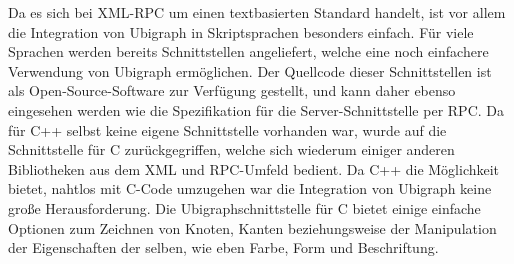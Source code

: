 Da es sich bei XML-RPC um einen textbasierten Standard handelt, ist vor allem die Integration von Ubigraph in Skriptsprachen besonders einfach. Für viele Sprachen werden bereits Schnittstellen angeliefert,
welche eine noch einfachere Verwendung von Ubigraph ermöglichen. Der Quellcode dieser Schnittstellen ist als Open-Source-Software zur Verfügung gestellt, und kann daher ebenso eingesehen werden wie die
Spezifikation für die Server-Schnittstelle per RPC\@. Da für C++ selbst keine eigene Schnittstelle vorhanden war, wurde auf die Schnittstelle für C zurückgegriffen, welche sich wiederum einiger anderen Bibliotheken
aus dem XML und RPC-Umfeld bedient. Da C++ die Möglichkeit bietet, nahtlos mit C-Code umzugehen war die Integration von Ubigraph keine große Herausforderung. Die Ubigraphschnittstelle für C bietet einige
einfache Optionen zum Zeichnen von Knoten, Kanten beziehungsweise der Manipulation der Eigenschaften der selben, wie eben Farbe, Form und Beschriftung.
